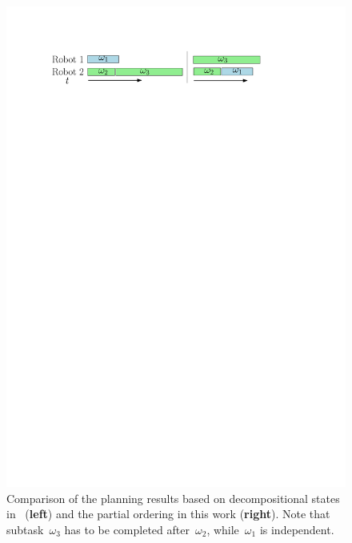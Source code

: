 \begin{figure}[t!]
	\centering
	\includegraphics[width=0.95\linewidth]{figures/concurrent.pdf}
	\caption{Comparison of the planning results based on decompositional states
		in~\citep{schillinger2018simultaneous} (\textbf{left}) and the partial ordering in this work (\textbf{right}).
		Note that subtask~$\omega_3$ has to be {completed}
                after~$\omega_2$, while~$\omega_1$ is independent.}
		\label{fig:concurrent}
\end{figure}



